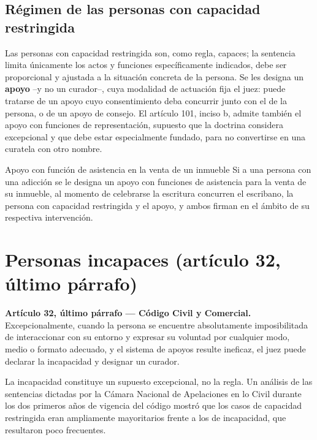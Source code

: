 \documentclass[12pt,oneside]{book}
\begin{document}
\subsection{Régimen de las personas con capacidad restringida}

Las personas con capacidad restringida son, como regla, capaces; la sentencia limita únicamente los actos y funciones específicamente indicados, debe ser proporcional y ajustada a la situación concreta de la persona. Se les designa un \textbf{apoyo} --y no un curador--, cuya modalidad de actuación fija el juez: puede tratarse de un apoyo cuyo consentimiento deba concurrir junto con el de la persona, o de un apoyo de consejo. El artículo 101, inciso b, admite también el apoyo con funciones de representación, supuesto que la doctrina considera excepcional y que debe estar especialmente fundado, para no convertirse en una curatela con otro nombre.

\begin{example}{Apoyo con función de asistencia en la venta de un inmueble}
Si a una persona con una adicción se le designa un apoyo con funciones de asistencia para la venta de su inmueble, al momento de celebrarse la escritura concurren el escribano, la persona con capacidad restringida y el apoyo, y ambos firman en el ámbito de su respectiva intervención.
\end{example}

\section{Personas incapaces (artículo 32, último párrafo)}

\begin{important}
\textbf{Artículo 32, último párrafo --- Código Civil y Comercial.} Excepcionalmente, cuando la persona se encuentre absolutamente imposibilitada de interaccionar con su entorno y expresar su voluntad por cualquier modo, medio o formato adecuado, y el sistema de apoyos resulte ineficaz, el juez puede declarar la incapacidad y designar un curador.
\end{important}

La incapacidad constituye un supuesto excepcional, no la regla. Un análisis de las sentencias dictadas por la Cámara Nacional de Apelaciones en lo Civil durante los dos primeros años de vigencia del código mostró que los casos de capacidad restringida eran ampliamente mayoritarios frente a los de incapacidad, que resultaron poco frecuentes.
\end{document}
